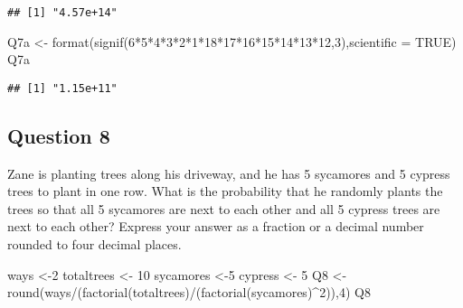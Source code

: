 \documentclass[
]{article}
\newenvironment{Shaded}{\begin{snugshade}}{\end{snugshade}}
\newcommand{\AttributeTok}[1]{\textcolor[rgb]{0.77,0.63,0.00}{#1}}
\newcommand{\ConstantTok}[1]{\textcolor[rgb]{0.00,0.00,0.00}{#1}}
\newcommand{\DecValTok}[1]{\textcolor[rgb]{0.00,0.00,0.81}{#1}}
\newcommand{\FunctionTok}[1]{\textcolor[rgb]{0.00,0.00,0.00}{#1}}
\newcommand{\NormalTok}[1]{#1}
\newcommand{\OtherTok}[1]{\textcolor[rgb]{0.56,0.35,0.01}{#1}}
\newcommand{\SpecialCharTok}[1]{\textcolor[rgb]{0.00,0.00,0.00}{#1}}
\begin{document}
\begin{verbatim}
## [1] "4.57e+14"
\end{verbatim}

\begin{Shaded}
\begin{Highlighting}[]
\NormalTok{Q7a }\OtherTok{\textless{}{-}} \FunctionTok{format}\NormalTok{(}\FunctionTok{signif}\NormalTok{(}\DecValTok{6}\SpecialCharTok{*}\DecValTok{5}\SpecialCharTok{*}\DecValTok{4}\SpecialCharTok{*}\DecValTok{3}\SpecialCharTok{*}\DecValTok{2}\SpecialCharTok{*}\DecValTok{1}\SpecialCharTok{*}\DecValTok{18}\SpecialCharTok{*}\DecValTok{17}\SpecialCharTok{*}\DecValTok{16}\SpecialCharTok{*}\DecValTok{15}\SpecialCharTok{*}\DecValTok{14}\SpecialCharTok{*}\DecValTok{13}\SpecialCharTok{*}\DecValTok{12}\NormalTok{,}\DecValTok{3}\NormalTok{),}\AttributeTok{scientific =} \ConstantTok{TRUE}\NormalTok{)}
\NormalTok{Q7a}
\end{Highlighting}
\end{Shaded}

\begin{verbatim}
## [1] "1.15e+11"
\end{verbatim}

\hypertarget{question-8}{%
\subsection{Question 8}\label{question-8}}

Zane is planting trees along his driveway, and he has 5 sycamores and 5
cypress trees to plant in one row. What is the probability that he
randomly plants the trees so that all 5 sycamores are next to each other
and all 5 cypress trees are next to each other? Express your answer as a
fraction or a decimal number rounded to four decimal places.

\begin{Shaded}
\begin{Highlighting}[]
\NormalTok{ways }\OtherTok{\textless{}{-}}\DecValTok{2}
\NormalTok{totaltrees }\OtherTok{\textless{}{-}} \DecValTok{10}
\NormalTok{sycamores }\OtherTok{\textless{}{-}}\DecValTok{5}
\NormalTok{cypress }\OtherTok{\textless{}{-}} \DecValTok{5}
\NormalTok{Q8 }\OtherTok{\textless{}{-}} \FunctionTok{round}\NormalTok{(ways}\SpecialCharTok{/}\NormalTok{(}\FunctionTok{factorial}\NormalTok{(totaltrees)}\SpecialCharTok{/}\NormalTok{(}\FunctionTok{factorial}\NormalTok{(sycamores)}\SpecialCharTok{\^{}}\DecValTok{2}\NormalTok{)),}\DecValTok{4}\NormalTok{)}
\NormalTok{Q8}
\end{Highlighting}
\end{Shaded}
\end{document}
